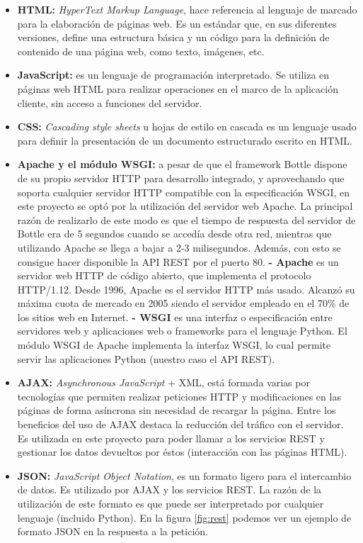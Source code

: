 \begin{itemize}
\item \textbf{HTML:} \textit{HyperText Markup Language}, hace referencia al lenguaje de marcado para la elaboración de páginas web. Es un estándar que, en sus diferentes versiones, define una estructura básica y un código para la definición de contenido de una página web, como texto, imágenes, etc.
\item \textbf{JavaScript:} es un lenguaje de programación interpretado. Se utiliza en páginas web HTML para realizar
operaciones en el marco de la aplicación cliente, sin acceso a funciones del servidor.
\item \textbf{CSS:} \textit{Cascading style sheets} u hojas de estilo en cascada es un lenguaje usado para definir la presentación de un documento estructurado escrito en HTML.
\item \textbf{Apache y el módulo WSGI:} a pesar de que el framework Bottle dispone de su propio servidor HTTP para desarrollo integrado, y aprovechando que soporta cualquier servidor HTTP compatible con la especificación WSGI, en este proyecto se optó por la utilización del servidor web Apache. La principal razón de realizarlo de este modo es que el tiempo de respuesta del servidor de Bottle era de 5 segundos cuando se accedía desde otra red, mientras que utilizando Apache se llega a bajar a 2-3 milisegundos. Además, con esto se consigue hacer disponible la API REST por el puerto 80.
\subitem \textbf{- Apache} es un servidor web HTTP de código abierto, que implementa el protocolo HTTP/1.12. Desde 1996, Apache es el servidor HTTP más usado. Alcanzó su máxima cuota de mercado en 2005 siendo el servidor empleado en el 70\% de los sitios web en Internet.
\subitem \textbf{- WSGI} es una interfaz o especificación entre servidores web y aplicaciones web o frameworks para el lenguaje Python. El módulo WSGI de Apache implementa la interfaz WSGI, lo cual permite servir las aplicaciones Python (nuestro caso el API REST).
\item \textbf{AJAX:} \textit{Asynchronous JavaScript} + XML, está formada varias por tecnologías que permiten realizar peticiones HTTP y modificaciones en las páginas de forma asíncrona sin necesidad de recargar la página. Entre los beneficios del uso de AJAX destaca la reducción del tráfico con el servidor. Es utilizada en este proyecto para poder llamar a los servicios REST y gestionar los datos devueltos por éstos (interacción con las páginas HTML).
\item \textbf{JSON:} \textit{JavaScript Object Notation}, es un formato ligero para el intercambio de datos. Es utilizado por AJAX y los servicios REST. La razón de la utilización de este formato es que puede ser interpretado por cualquier lenguaje (incluido Python). En la figura \ref{fig:rest} podemos ver un ejemplo de formato JSON en la respuesta a la petición.
\end{itemize}

